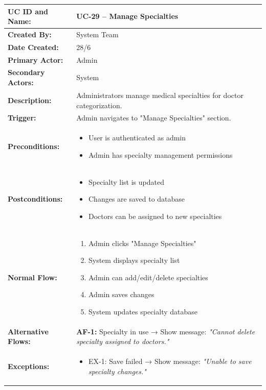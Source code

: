 \documentclass[12pt,a4paper]{article}
\begin{document}
\renewcommand{\arraystretch}{1.5}
\begin{longtable}{|p{4.5cm}|p{10.5cm}|}
\hline
\textbf{UC ID and Name:} & UC-29 – Manage Specialties \\
\hline
\textbf{Created By:} & System Team \\
\hline
\textbf{Date Created:} & 28/6 \\
\hline
\textbf{Primary Actor:} & Admin \\
\hline
\textbf{Secondary Actors:} & System \\
\hline
\textbf{Description:} & Administrators manage medical specialties for doctor categorization. \\
\hline
\textbf{Trigger:} & Admin navigates to "Manage Specialties" section. \\
\hline
\textbf{Preconditions:} &
\begin{itemize}
  \item User is authenticated as admin
  \item Admin has specialty management permissions
\end{itemize} \\
\hline
\textbf{Postconditions:} &
\begin{itemize}
  \item Specialty list is updated
  \item Changes are saved to database
  \item Doctors can be assigned to new specialties
\end{itemize} \\
\hline
\textbf{Normal Flow:} &
\begin{enumerate}
  \item Admin clicks "Manage Specialties"
  \item System displays specialty list
  \item Admin can add/edit/delete specialties
  \item Admin saves changes
  \item System updates specialty database
\end{enumerate} \\
\hline
\textbf{Alternative Flows:} &
\textbf{AF-1:} Specialty in use → Show message: \textit{"Cannot delete specialty assigned to doctors."} \\
\hline
\textbf{Exceptions:} &
\begin{itemize}
  \item EX-1: Save failed → Show message: \textit{"Unable to save specialty changes."}
\end{itemize} \\

\end{longtable}
\end{document}
